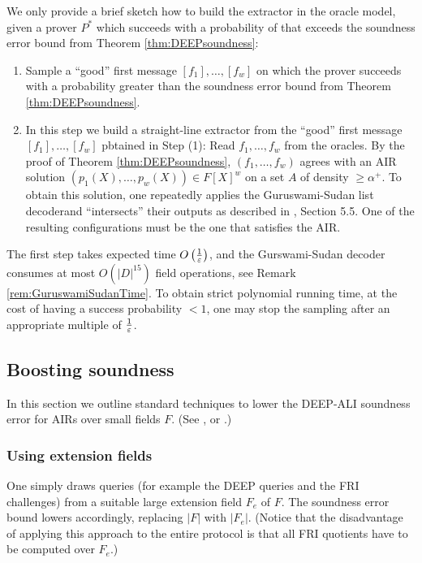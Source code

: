 \documentclass[11pt,article,oneside]{memoir}
\theoremstyle{definition}
\theoremstyle{remark}
\begin{document}
We only provide a brief sketch how to build the extractor in the oracle model, given a prover $P^*$ which succeeds with a probability of that exceeds the soundness error bound from Theorem \ref{thm:DEEPsoundness}:
\begin{enumerate}
\item
Sample a “good” first message $[f_1],\ldots , [f_w]$ on which the prover succeeds with a probability greater than the soundness error bound from Theorem \ref{thm:DEEPsoundness}.

\item
In this step we build a straight-line extractor from the “good” first message $[f_1],\ldots , [f_w]$ pbtained in Step (1):
Read $f_1, \ldots ,f_w$ from the oracles. 
By the proof of Theorem \ref{thm:DEEPsoundness}, $(f_1,\ldots ,f_w)$ agrees with an AIR solution $(p_1(X),\ldots ,p_w(X))\in F[X]^w$ on a set $A$ of density $\geq \alpha^+$. 
To obtain this solution, one repeatedly applies the Guruswami-Sudan list decoder\footnotemark and   “intersects” their outputs as described in \cite{ethSTARK}, Section 5.5.
One of the resulting configurations must be the one that satisfies the AIR.
%
\end{enumerate}

The first step takes expected time $O\left(\nicefrac{1}{\varepsilon}\right)$, and the Gurswami-Sudan decoder consumes at most $O\left(|D|^{15}\right)$ field operations, see Remark \ref{rem:GuruswamiSudanTime}.
To obtain strict polynomial running time, at the cost of having a success probability $<1$, one may stop the sampling after an appropriate multiple of $\nicefrac{1}{\varepsilon}$.
 
\subsection{Boosting soundness}
In this section we outline standard techniques to lower the DEEP-ALI soundness error for AIRs over small fields $F$. 
(See \cite{ethSTARK}, or \cite{PolygonZero}.)

\subsubsection{Using extension fields}
One simply draws queries (for example the DEEP queries and the FRI challenges) from a suitable large extension field $F_e$ of $F$.
The soundness error bound lowers accordingly, replacing $|F|$ with $|F_e|$. 
(Notice that the disadvantage of applying this approach to the entire protocol is that all FRI quotients have to be computed over $F_e$.)
 
\end{document}
